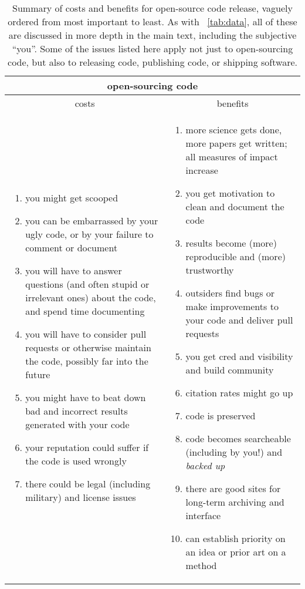 \documentclass[12pt,twoside,pdftex]{article}
\begin{document}
\begin{table}%
\begin{tabular}{@{}p{\cwidth}|p{\cwidth}@{}}%
\multicolumn{2}{c}{\textbf{open-sourcing code}} \\ \hline
\multicolumn{1}{c|}{costs} & \multicolumn{1}{c}{benefits} \\ \hline
\begin{enumerate}\raggedright
\item you might get scooped
\item you can be embarrassed by your ugly code, or by your failure to comment or document
\item you will have to answer questions (and often stupid or irrelevant ones) about the code, and spend time documenting
\item you will have to consider pull requests or otherwise maintain the code, possibly far into the future
\item you might have to beat down bad and incorrect results generated with your code
\item your reputation could suffer if the code is used wrongly
\item there could be legal (including military) and license issues
\end{enumerate}&\begin{enumerate}\raggedright
\item more science gets done, more papers get written; all measures of impact increase
\item you get motivation to clean and document the code
\item results become (more) reproducible and (more) trustworthy
\item outsiders find bugs or make improvements to your code and deliver pull requests
\item you get cred and visibility and build community
\item citation rates might go up
\item code is preserved
\item code becomes searcheable (including by you!) and \emph{backed up}
\item there are good sites for long-term archiving and interface
\item can establish priority on an idea or prior art on a method
\end{enumerate}\end{tabular}
\caption{Summary of costs and benefits for open-source code release,
  vaguely ordered from most important to least. As with
  \tablename~\ref{tab:data}, all of these are discussed in more depth
  in the main text, including the subjective ``you''. Some of the
  issues listed here apply not just to open-sourcing code, but also to
  releasing code, publishing code, or shipping
  software.\label{tab:code}}
\end{table}
\end{document}
